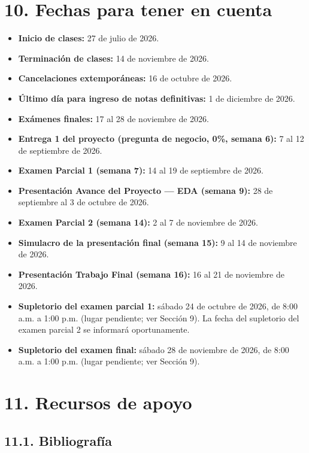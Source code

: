 \documentclass[11pt,a4paper]{article}
\begin{document}
\section*{10. Fechas para tener en cuenta}

\begin{itemize}
    \item \textbf{Inicio de clases:} 27 de julio de 2026.
    \item \textbf{Terminación de clases:} 14 de noviembre de 2026.
    \item \textbf{Cancelaciones extemporáneas:} 16 de octubre de 2026.
    \item \textbf{Último día para ingreso de notas definitivas:} 1 de diciembre de 2026.
    \item \textbf{Exámenes finales:} 17 al 28 de noviembre de 2026.
    \item \textbf{Entrega 1 del proyecto (pregunta de negocio, 0\%, semana 6):} 7 al 12 de septiembre de 2026.
    \item \textbf{Examen Parcial 1 (semana 7):} 14 al 19 de septiembre de 2026.
    \item \textbf{Presentación Avance del Proyecto --- EDA (semana 9):} 28 de septiembre al 3 de octubre de 2026.
    \item \textbf{Examen Parcial 2 (semana 14):} 2 al 7 de noviembre de 2026.
    \item \textbf{Simulacro de la presentación final (semana 15):} 9 al 14 de noviembre de 2026.
    \item \textbf{Presentación Trabajo Final (semana 16):} 16 al 21 de noviembre de 2026.
    \item \textbf{Supletorio del examen parcial 1:} sábado 24 de octubre de 2026, de 8:00 a.m. a 1:00 p.m. (lugar pendiente; ver Sección 9). La fecha del supletorio del examen parcial 2 se informará oportunamente.
    \item \textbf{Supletorio del examen final:} sábado 28 de noviembre de 2026, de 8:00 a.m. a 1:00 p.m. (lugar pendiente; ver Sección 9).
\end{itemize}

\section*{11. Recursos de apoyo}

\subsection*{11.1. Bibliografía}
\end{document}
